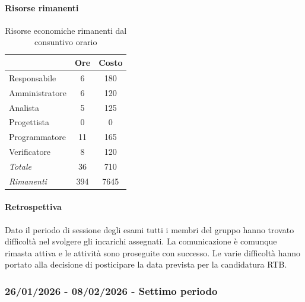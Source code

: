 \documentclass[a4paper,12pt]{article}
\begin{document}
            \paragraph{Risorse rimanenti}
                \begin{table}[H]
                \centering
                \caption{Risorse economiche rimanenti dal consuntivo orario}
                \begin{tabular}{|l|c|c|}
                \hline
                    \rowcolor{lightgray}{\textbf{Ruolo}} & {\textbf{Ore}} & {\textbf{Costo}}\\
                \hline
                    Responsabile & 6 & 180\\
                \hline
                    Amministratore & 6 & 120\\
                \hline
                    Analista & 5 & 125\\
                \hline
                    Progettista & 0 & 0\\
                \hline
                    Programmatore & 11 & 165\\
                \hline
                    Verificatore & 8 & 120\\
                \hline
                    \rowcolor{lightgray}\textit{Totale} & 36 & 710\\
                \hline
                    \rowcolor{lightgray}\textit{Rimanenti} & 394 & 7645\\
                \hline
                \end{tabular}
                \end{table}
                
            \paragraph{Retrospettiva}
            Dato il periodo di sessione degli esami tutti i membri del gruppo hanno trovato difficoltà nel svolgere gli incarichi assegnati. La comunicazione è comunque rimasta attiva e le attività sono proseguite con successo. Le varie difficoltà hanno portato alla decisione di posticipare la data prevista per la candidatura RTB.


        \subsubsection{26/01/2026 - 08/02/2026 - Settimo periodo}
\end{document}
